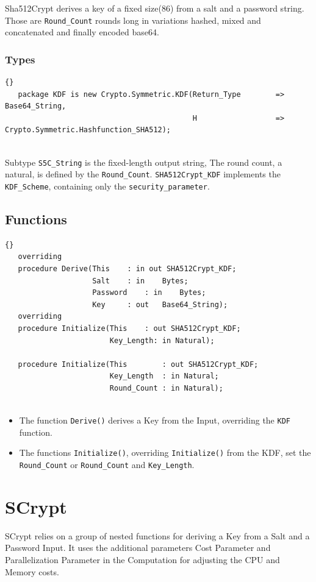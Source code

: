 Sha512Crypt derives a key of a fixed size(86) from a salt and a password string. Those are \texttt{Round\_Count} rounds long in variations hashed, mixed and concatenated and finally encoded base64.
\subsubsection*{Types}
\begin{lstlisting}{}
   package KDF is new Crypto.Symmetric.KDF(Return_Type        => Base64_String,
                                           H                  => Crypto.Symmetric.Hashfunction_SHA512);


\end{lstlisting}
Subtype \texttt{S5C\_String} is the fixed-length output string, The round count, a natural, is defined by the \texttt{Round\_Count}. \texttt{SHA512Crypt\_KDF} implements the \texttt{KDF\_Scheme}, containing only the \texttt{security\_parameter}. 

\subsection*{Functions}
\begin{lstlisting}{}
   overriding
   procedure Derive(This	: in out SHA512Crypt_KDF;
                    Salt	: in 	Bytes;
                    Password	: in	Bytes;
                    Key		: out	Base64_String);
   overriding
   procedure Initialize(This	: out SHA512Crypt_KDF;
                        Key_Length: in Natural);

   procedure Initialize(This		: out SHA512Crypt_KDF;
                        Key_Length	: in Natural;
                        Round_Count	: in Natural);


\end{lstlisting}
\begin{itemize}
	\item The function \texttt{Derive()} derives a Key from the Input, overriding the \texttt{KDF} function.
	\item The functions \texttt{Initialize()}, overriding \texttt{Initialize()} from the KDF, set the \texttt{Round\_Count} or \texttt{Round\_Count} and \texttt{Key\_Length}.
\end{itemize}


\section{SCrypt}
SCrypt relies on a group of nested functions for deriving a Key from a Salt and a Password Input. It uses the additional parameters Cost Parameter and Parallelization Parameter in the Computation for adjusting the CPU and Memory costs.
